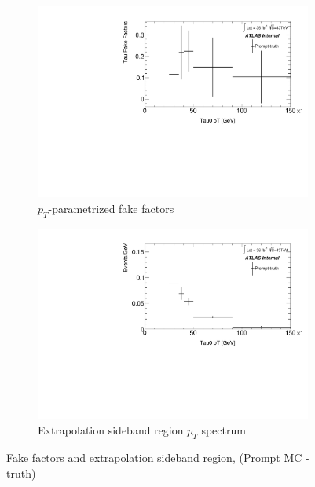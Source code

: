 \documentclass[11pt]{article}
\begin{document}
	\begin{figure}[H]
	\centering
	\begin{subfigure}{.5\textwidth}
	\centering
	\includegraphics[width=0.95\linewidth]{figures/FakesEstimate_data_pp8_nonallhad_new_scaledHists/FF_Faketau_Prompt-truth.pdf}
  	\caption{$p_T$-parametrized fake factors}
  	\label{fig:sub1}
	\end{subfigure}%
	\begin{subfigure}{.5\textwidth}
	\centering
	\includegraphics[width=0.95\linewidth]{figures/FakesEstimate_data_pp8_nonallhad_new_scaledHists/hist_Extrapolation_Prompt-truth.pdf}
	\caption{Extrapolation sideband region $p_T$ spectrum}
	\end{subfigure}
	\caption{Fake factors and extrapolation sideband region, (Prompt MC - truth)}
	\end{figure}
	
\end{document}
